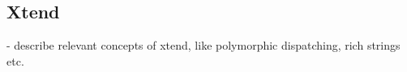 \subsection{Xtend}

- describe relevant concepts of xtend, like polymorphic dispatching, rich strings etc.

